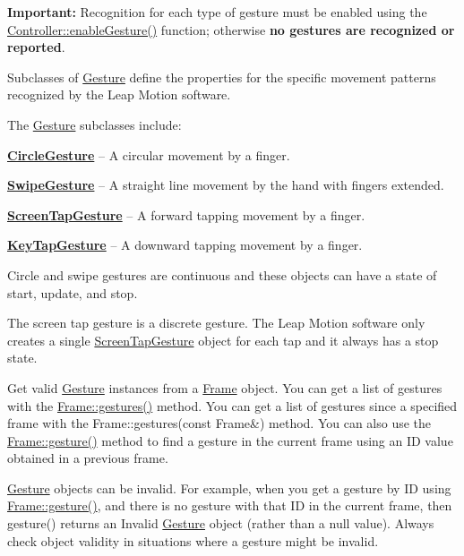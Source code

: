 {\bfseries Important\+:} Recognition for each type of gesture must be enabled using the \hyperlink{class_leap_1_1_controller_a3e7ee0e1418e1cee5274274d50f3a998}{Controller\+::enable\+Gesture()} function; otherwise {\bfseries no gestures are recognized or reported}.


\begin{DoxyCodeInclude}
\end{DoxyCodeInclude}


Subclasses of \hyperlink{class_leap_1_1_gesture}{Gesture} define the properties for the specific movement patterns recognized by the Leap Motion software.

The \hyperlink{class_leap_1_1_gesture}{Gesture} subclasses include\+:

{\bfseries \hyperlink{class_leap_1_1_circle_gesture}{Circle\+Gesture}} -- A circular movement by a finger.

{\bfseries \hyperlink{class_leap_1_1_swipe_gesture}{Swipe\+Gesture}} -- A straight line movement by the hand with fingers extended.

{\bfseries \hyperlink{class_leap_1_1_screen_tap_gesture}{Screen\+Tap\+Gesture}} -- A forward tapping movement by a finger.

{\bfseries \hyperlink{class_leap_1_1_key_tap_gesture}{Key\+Tap\+Gesture}} -- A downward tapping movement by a finger.

Circle and swipe gestures are continuous and these objects can have a state of start, update, and stop.

The screen tap gesture is a discrete gesture. The Leap Motion software only creates a single \hyperlink{class_leap_1_1_screen_tap_gesture}{Screen\+Tap\+Gesture} object for each tap and it always has a stop state.

Get valid \hyperlink{class_leap_1_1_gesture}{Gesture} instances from a \hyperlink{class_leap_1_1_frame}{Frame} object. You can get a list of gestures with the \hyperlink{class_leap_1_1_frame_a09f7850e3b1a92585f319c74e189cc0e}{Frame\+::gestures()} method. You can get a list of gestures since a specified frame with the {\ttfamily Frame\+::gestures(const Frame\&)} method. You can also use the {\ttfamily \hyperlink{class_leap_1_1_frame_a107df376205952e9ade4237592494a0e}{Frame\+::gesture()}} method to find a gesture in the current frame using an ID value obtained in a previous frame.

\hyperlink{class_leap_1_1_gesture}{Gesture} objects can be invalid. For example, when you get a gesture by ID using {\ttfamily \hyperlink{class_leap_1_1_frame_a107df376205952e9ade4237592494a0e}{Frame\+::gesture()}}, and there is no gesture with that ID in the current frame, then {\ttfamily gesture()} returns an Invalid \hyperlink{class_leap_1_1_gesture}{Gesture} object (rather than a null value). Always check object validity in situations where a gesture might be invalid.

